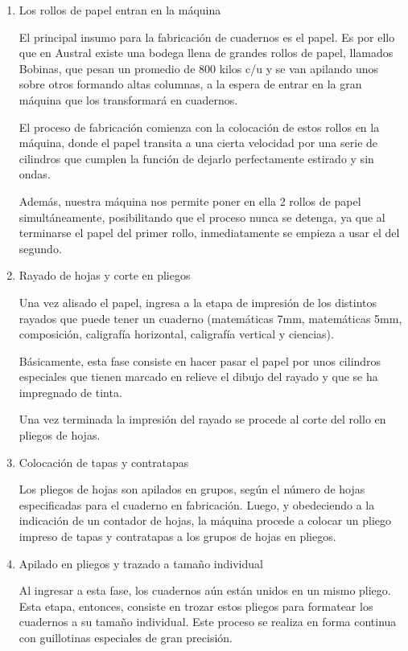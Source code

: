 \documentclass[a4paper]{article}
\begin{document}
\begin{enumerate}
\large
\item Los rollos de papel entran en la máquina

El principal insumo para la fabricación de cuadernos es el papel. Es por ello que en Austral existe una bodega llena de grandes rollos de papel, llamados Bobinas, que pesan un promedio de 800 kilos c/u y se van apilando unos sobre otros formando altas columnas, a la espera de entrar en la gran máquina que los transformará en cuadernos.

El proceso de fabricación comienza con la colocación de estos rollos en la máquina, donde el papel transita a una cierta velocidad por una serie de cilindros que cumplen la función de dejarlo perfectamente estirado y sin ondas.

Además, nuestra máquina nos permite poner en ella 2 rollos de papel simultáneamente, posibilitando que el proceso nunca se detenga, ya que al terminarse el papel del primer rollo, inmediatamente se empieza a usar el del segundo.

\item Rayado de hojas y corte en pliegos

Una vez alisado el papel, ingresa a la etapa de impresión de los distintos rayados que puede tener un cuaderno (matemáticas 7mm, matemáticas 5mm, composición, caligrafía horizontal, caligrafía vertical y ciencias).

Básicamente, esta fase consiste en hacer pasar el papel por unos cilindros especiales que tienen marcado en relieve el dibujo del rayado y que se ha impregnado de tinta.

Una vez terminada la impresión del rayado se procede al corte del rollo en pliegos de hojas.

\item Colocación de tapas y contratapas

Los pliegos de hojas son apilados en grupos, según el número de hojas especificadas para el cuaderno en fabricación. Luego, y obedeciendo a la indicación de un contador de hojas, la máquina procede a colocar un pliego impreso de tapas y contratapas a los grupos de hojas en pliegos.

\item Apilado en pliegos y trazado a tamaño individual

Al ingresar a esta fase, los cuadernos aún están unidos en un mismo pliego. Esta etapa, entonces, consiste en trozar estos pliegos para formatear los cuadernos a su tamaño individual. Este proceso se realiza en forma continua con guillotinas especiales de gran precisión.


\end{enumerate}
\end{document}

